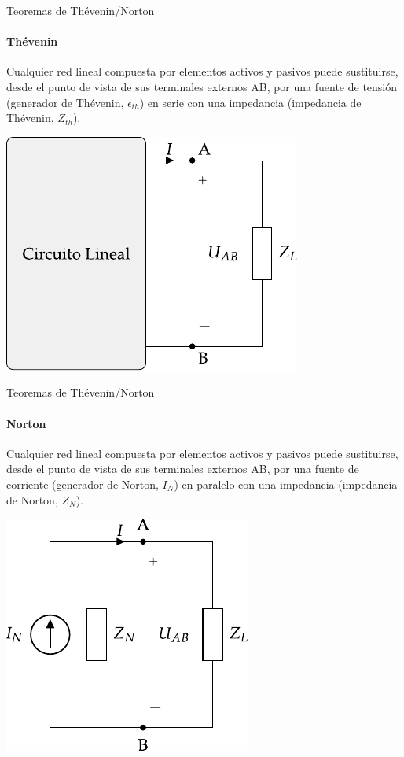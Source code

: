 \documentclass[aspectratio=169, usenames,svgnames,dvipsnames]{beamer}
\begin{document}
\begin{frame}[label={sec:org199a3be}]{Teoremas de Thévenin/Norton}
\framesubtitle{Thévenin}

Cualquier \alert{red lineal} compuesta por elementos activos y pasivos puede sustituirse, desde el punto de vista de sus terminales externos AB, por una \alert{fuente de tensión} (generador de Thévenin, \(\epsilon_{th}\)) en \alert{serie} con una impedancia (impedancia de Thévenin, \(Z_{th}\)).

\begin{center}
\includegraphics[height=0.6\textheight]{../figs/EquivalenteThevenin.pdf}
\end{center}
\end{frame}

\begin{frame}[label={sec:orga39b84b}]{Teoremas de Thévenin/Norton}
\framesubtitle{Norton}
Cualquier \alert{red lineal} compuesta por elementos activos y pasivos puede sustituirse, desde el punto de vista de sus terminales externos AB, por una \alert{fuente de corriente} (generador de Norton, \(I_N\)) en \alert{paralelo} con una impedancia (impedancia de Norton, \(Z_N\)).

\begin{center}
\includegraphics[height=0.6\textheight]{../figs/EquivalenteNorton.pdf}
\end{center}
\end{frame}
\end{document}

